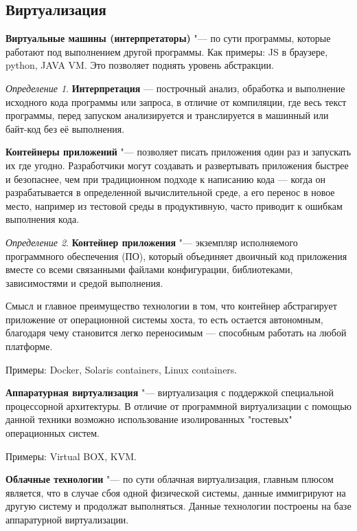 \documentclass[bachelor, och, book]{SCWorks}
\theoremstyle{remark}
\newtheorem{definition}{Определение}
\begin{document}
    \subsection{Виртуализация}

    \textbf{Виртуальные машины (интерпретаторы)} "--- по сути программы, которые работают под выполнением другой программы. Как примеры: JS в браузере, python, JAVA VM. Это позволяет поднять уровень абстракции.

    \begin{definition}
        \textbf{Интерпретация} — построчный анализ, обработка и выполнение исходного кода программы или запроса, в отличие от компиляции, где весь текст программы, перед запуском анализируется и транслируется в машинный или байт-код без её выполнения.
    \end{definition}

    \textbf{Контейнеры приложений} "--- позволяет писать приложения один раз и запускать их где угодно. Разработчики могут создавать и развертывать приложения быстрее и безопаснее, чем при традиционном подходе к написанию кода — когда он разрабатывается в определенной вычислительной среде, а его перенос в новое место, например из тестовой среды в продуктивную, часто приводит к ошибкам выполнения кода.

    \begin{definition}
        \textbf{Контейнер приложения} "--- экземпляр исполняемого программного обеспечения (ПО), который объединяет двоичный код приложения вместе со всеми связанными файлами конфигурации, библиотеками, зависимостями и средой выполнения.
    \end{definition}

    Смысл и главное преимущество технологии в том, что контейнер абстрагирует приложение от операционной системы хоста, то есть остается автономным, благодаря чему становится легко переносимым — способным работать на любой платформе.

    Примеры: Docker, Solaris containers, Linux containers. 

    \textbf{Аппаратурная виртуализация} "--- виртуализация с поддержкой специальной процессорной архитектуры. В отличие от программной виртуализации с помощью данной техники возможно использование изолированных "гостевых" операционных систем.

    Примеры: Virtual BOX, KVM.


    \textbf{Облачные технологии} "--- по сути облачная виртуализация, главным плюсом является, что в случае сбоя одной физической системы, данные иммигрируют на другую систему и продолжат выполняться. Данные технологии построены на базе аппаратурной виртуализации.
\end{document}
